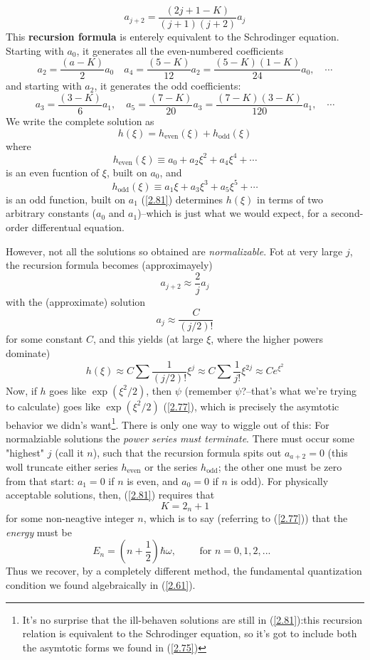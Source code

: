 \begin{equation}\label{2.81}
	a_{j+2}=\frac{(2j+1-K)}{(j+1)(j+2)}a_j
\end{equation}
This \textbf{recursion formula} is enterely equivalent to the Schrodinger equation. Starting with $a_0$, it generates all the even-numbered coefficients
$$a_2=\frac{(a-K)}{2}a_0\quad a_4=\frac{(5-K)}{12}a_2=\frac{(5-K)(1-K)}{24}a_0,\quad \cdots $$
and starting with $a_2$, it generates the odd coefficients: $$a_3=\frac{(3-K)}{6}a_1,\quad a_5=\frac{(7-K)}{20}a_3=\frac{(7-K)(3-K)}{120}a_1,\quad \cdots $$
We write the complete solution as
\begin{equation}\label{2.82}
	h(\xi)=h_{\mbox{even}}(\xi)+h_{\mbox{odd}}(\xi)
\end{equation}
where $$h_{\mbox{even}}(\xi)\equiv a_0+a_2\xi^2+a_4\xi^4+\cdots $$ is an even fucntion of $\xi$, built on $a_0$, and $$h_{\mbox{odd}}(\xi)\equiv a_1\xi+a_3\xi^3+a_5\xi^5+\cdots $$ is an odd function, built on $a_1$
(\ref{2.81}) determines $h(\xi)$ in terms of two arbitrary constants ($a_0$ and $a_1$)--which is just what we would expect, for a second-order differentual equation.

However, not all the solutions so obtained are \textit{normalizable}. Fot at very large $j$, the recursion formula becomes (approximayely) $$a_{j+2}\approx \frac{2}{j}a_j$$ with the (approximate) solution $$a_j\approx\frac{C}{(j/2)!}$$ for some constant $C$, and this yields (at large $\xi$, where the higher powers dominate) $$h(\xi)\approx C\sum\frac{1}{(j/2)!}\xi^j\approx C\sum\frac{1}{j!}\xi^{2j}\approx Ce^{\xi^2}$$ Now, if $h$ goes like $\exp(\xi^2/2)$, then $\psi$ (remember $\psi$?--that's what we're trying to calculate) goes like $\exp(\xi^2/2)$ (\ref{2.77}), which is precisely the asymtotic behavior we didn's want\footnote{It's no surprise that the ill-behaven solutions are still in (\ref{2.81}):this recursion relation is equivalent to the Schrodinger equation, so it's got to include both the asymtotic forms we found in (\ref{2.75})}. There is only one way to wiggle out of this: For normalziable solutions the \textit{power series must terminate}. There must occur some "highest" $j$ (call it $n$), such that the recursion formula spits out $a_{a+2}=0$ (this woll truncate either series $h_{\mbox{even}}$ or the series $h_{\mbox{odd}}$; the other one must be zero from that start: $a_1=0$ if $n$ is even, and $a_0=0$ if $n$ is odd). For physically acceptable solutions, then, (\ref{2.81}) requires that $$K=2_n+1$$ for some non-neagtive integer $n$, which is to say (referring to (\ref{2.77})) that the \textit{energy} must be
\begin{equation}\label{2.83}
	E_n=\left(n+\frac{1}{2}\right)\hbar\omega,\qquad \mbox{ for $n=0,1,2,...$ }
\end{equation}
Thus we recover, by a completely different method, the fundamental quantization condition we found algebraically in (\ref{2.61}).









